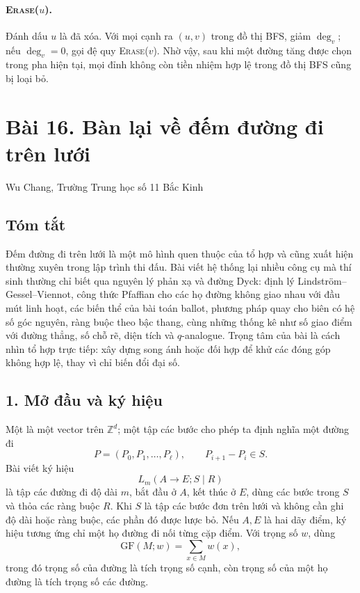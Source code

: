 \documentclass[11pt]{article}
\begin{document}
\paragraph{\textsc{Erase}(\(u\)).}
Đánh dấu \(u\) là đã xóa. Với mọi cạnh ra \((u,v)\) trong đồ thị BFS, giảm
\(\deg_v\); nếu \(\deg_v=0\), gọi đệ quy \textsc{Erase}(\(v\)). Nhờ vậy, sau
khi một đường tăng được chọn trong pha hiện tại, mọi đỉnh không còn tiền nhiệm
hợp lệ trong đồ thị BFS cũng bị loại bỏ.

\section*{Bài 16. Bàn lại về đếm đường đi trên lưới}

\begin{center}
Wu Chang, Trường Trung học số 11 Bắc Kinh
\end{center}

\subsection*{Tóm tắt}

Đếm đường đi trên lưới là một mô hình quen thuộc của tổ hợp và cũng xuất hiện
thường xuyên trong lập trình thi đấu. Bài viết hệ thống lại nhiều công cụ mà
thí sinh thường chỉ biết qua nguyên lý phản xạ và đường Dyck: định lý
Lindström--Gessel--Viennot, công thức Pfaffian cho các họ đường không giao
nhau với đầu mút linh hoạt, các biến thể của bài toán ballot, phương pháp quay
cho biên có hệ số góc nguyên, ràng buộc theo bậc thang, cùng những thống kê
như số giao điểm với đường thẳng, số chỗ rẽ, diện tích và \(q\)-analogue. Trọng
tâm của bài là cách nhìn tổ hợp trực tiếp: xây dựng song ánh hoặc đối hợp để
khử các đóng góp không hợp lệ, thay vì chỉ biến đổi đại số.

\subsection*{1. Mở đầu và ký hiệu}

Một  là một vector trên \(\mathbb Z^d\); một tập các bước cho phép
ta định nghĩa một đường đi
\[
  P=(P_0,P_1,\ldots,P_\ell),\qquad P_{i+1}-P_i\in S.
\]
Bài viết ký hiệu
\[
  L_m(A\to E;S\mid R)
\]
là tập các đường đi độ dài \(m\), bắt đầu ở \(A\), kết thúc ở \(E\), dùng các
bước trong \(S\) và thỏa các ràng buộc \(R\). Khi \(S\) là tập các bước đơn
trên lưới và không cần ghi độ dài hoặc ràng buộc, các phần đó được lược bỏ.
Nếu \(A,E\) là hai dãy điểm, ký hiệu tương ứng chỉ một họ đường đi nối từng
cặp điểm. Với trọng số \(w\), dùng
\[
  \mathrm{GF}(M;w)=\sum_{x\in M} w(x),
\]
trong đó trọng số của đường là tích trọng số cạnh, còn trọng số của một họ
đường là tích trọng số các đường.
\end{document}

